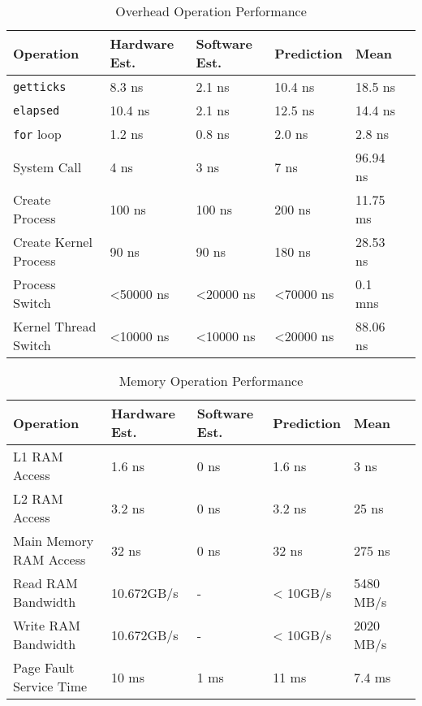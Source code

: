 \documentclass{article} %
\begin{document}
\begin{table}[!htbp]
  \caption{Overhead Operation Performance}
  \begin{center}
  \begin{tabular}{|l|l|l|l|l|l|}
    \hline
    Operation              & Hardware Est.         & Software Est.         & Prediction            & Mean     \\ \hline
    \texttt{getticks}      & 8.3 ns                & 2.1 ns                & 10.4 ns               & 18.5 ns\\ \hline
    \texttt{elapsed}       & 10.4 ns               & 2.1 ns                & 12.5 ns               & 14.4 ns\\ \hline
    \texttt{for} loop      & 1.2 ns                & 0.8 ns                & 2.0 ns                & 2.8 ns\\ \hline
    System Call            & 4 ns                  & 3 ns                  & 7 ns                  & 96.94 ns\\ \hline
    Create Process         & 100 ns                & 100 ns                & 200 ns                & 11.75 ms\\ \hline
    Create Kernel Process  & 90 ns                 & 90 ns                 & 180 ns                & 28.53 ns\\ \hline
    Process Switch         & \textless50000 ns     & \textless20000 ns     & \textless70000 ns     & 0.1 mns\\ \hline
    Kernel Thread Switch   & \textless10000 ns     & \textless10000 ns     & \textless20000 ns     & 88.06 ns\\ \hline
  \end{tabular}
  \end{center}
  \label{table:overview_overhead}
\end{table}

\begin{table}[!htbp]
  \caption{Memory Operation Performance}
  \begin{tabular}{|l|l|l|l|l|l|}
    \hline
    Operation               & Hardware Est. & Software Est. & Prediction & Mean      \\ \hline
    L1 RAM Access           & 1.6 ns        & 0 ns          & 1.6 ns     & 3 ns      \\ \hline
    L2 RAM Access           & 3.2 ns        & 0 ns          & 3.2 ns     & 25 ns     \\ \hline
    Main Memory RAM Access  & 32 ns         & 0 ns          & 32 ns      & 275 ns    \\ \hline
    Read RAM Bandwidth      & 10.672GB/s    & -             & < 10GB/s   & 5480 MB/s \\ \hline
    Write RAM Bandwidth     & 10.672GB/s    & -             & < 10GB/s   & 2020 MB/s \\ \hline
    Page Fault Service Time & 10 ms         & 1 ms          & 11 ms      & 7.4 ms    \\ \hline
  \end{tabular}
  \label{table:overview_memory}
\end{table}
\end{document}
